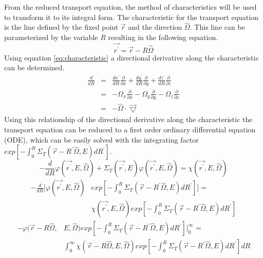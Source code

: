 From the reduced transport equation, the method of characteristics will be 
used to transform it to its integral form. The characteristic for the transport 
equation is the line defined by the fixed point $\vec{r}$ and the direction 
$\hat{\Omega}$. This line can be parameterized by the variable $R$ resulting in 
the following equation. 
\begin{equation}
  \vec{r^{'}} = \vec{r} - R\hat{\Omega}
  \label{eq:characteristic}
\end{equation}
Using equation \ref{eq:characteristic} a directional derivative along the
characteristic can be determined.
\begin{eqnarray}
  \frac{d}{dR} & = & \frac{dx^{'}}{dR}\frac{\partial}{\partial x} +
  \frac{dy^{'}}{dR}\frac{\partial}{\partial y} +
  \frac{dz^{'}}{dR}\frac{\partial}{\partial z} \nonumber \\
  & = & -\Omega_x \frac{\partial}{\partial x} -
  \Omega_y \frac{\partial}{\partial y} -
  \Omega_z \frac{\partial}{\partial z} \nonumber \\
  & = & -\hat{\Omega} \cdot \vec{\bigtriangledown}
\end{eqnarray}
Using this relationship of the directional derivative along the characteristic
the transport equation can be reduced to a first order ordinary differential 
equation (ODE), which can be easily solved with the integrating factor
$exp\left[-\int_0^R \Sigma_T(\vec{r}-R^{'}\hat{\Omega},E)dR^{'} \right]$.
\begin{equation*}
  -\frac{d}{dR}\varphi(\vec{r^{'}},E,\hat{\Omega}) + \Sigma_T(\vec{r^{'}},E)
  \varphi(\vec{r^{'}},E,\hat{\Omega}) = 
  \chi(\vec{r^{'}},E,\hat{\Omega})
\end{equation*}
\begin{equation*}
  \begin{split}
    -\frac{d}{dR}\bigg[\varphi(\vec{r^{'}},E,\hat{\Omega})
      &exp\left[-\int_0^R \Sigma_T(\vec{r}-R^{'}\hat{\Omega},E)dR^{'}\right]
      \bigg] = \\
    & \chi(\vec{r^{'}},E,\hat{\Omega})
    exp\left[-\int_0^R \Sigma_T(\vec{r}-R^{'}\hat{\Omega},E)dR^{'} \right]
  \end{split}
\end{equation*}
\begin{equation*}
  \begin{split}
    -\varphi(\vec{r} - R\hat{\Omega},&E,\hat{\Omega})
    exp\left[-\int_0^R \Sigma_T(\vec{r}-R^{'}\hat{\Omega},E)dR^{'}\right] 
    \bigg|_0^{\infty} = \\
    & \int_0^{\infty} 
    \chi(\vec{r} - R\hat{\Omega},E,\hat{\Omega})
    exp\left[-\int_0^R \Sigma_T(\vec{r}-R^{'}\hat{\Omega},E)dR^{'} \right] dR
  \end{split}
\end{equation*}

